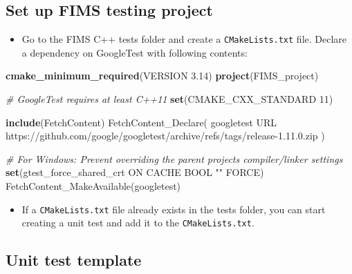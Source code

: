 \documentclass[
]{book}
\newenvironment{Shaded}{\begin{snugshade}}{\end{snugshade}}
\newcommand{\CommentTok}[1]{\textcolor[rgb]{0.56,0.35,0.01}{\textit{#1}}}
\newcommand{\DataTypeTok}[1]{\textcolor[rgb]{0.13,0.29,0.53}{#1}}
\newcommand{\DecValTok}[1]{\textcolor[rgb]{0.00,0.00,0.81}{#1}}
\newcommand{\FunctionTok}[1]{\textcolor[rgb]{0.00,0.00,0.00}{#1}}
\newcommand{\KeywordTok}[1]{\textcolor[rgb]{0.13,0.29,0.53}{\textbf{#1}}}
\newcommand{\NormalTok}[1]{#1}
\newcommand{\OtherTok}[1]{\textcolor[rgb]{0.56,0.35,0.01}{#1}}
\newcommand{\StringTok}[1]{\textcolor[rgb]{0.31,0.60,0.02}{#1}}
\providecommand{\tightlist}{%
  \setlength{\itemsep}{0pt}\setlength{\parskip}{0pt}}
\begin{document}
\hypertarget{set-up-fims-testing-project}{%
\subsection{Set up FIMS testing project}\label{set-up-fims-testing-project}}

\begin{itemize}
\tightlist
\item
  Go to the FIMS C++ tests folder and create a \texttt{CMakeLists.txt} file. Declare a dependency on GoogleTest with following contents:
\end{itemize}

\begin{Shaded}
\begin{Highlighting}[]
\KeywordTok{cmake\_minimum\_required}\NormalTok{(}\OtherTok{VERSION} \DataTypeTok{3.14}\NormalTok{)}
\KeywordTok{project}\NormalTok{(FIMS\_project)}

\CommentTok{\# GoogleTest requires at least C++11}
\KeywordTok{set}\NormalTok{(}\DecValTok{CMAKE\_CXX\_STANDARD}\NormalTok{ 11)}

\KeywordTok{include}\NormalTok{(FetchContent)}
\FunctionTok{FetchContent\_Declare}\NormalTok{(}
\NormalTok{  googletest}
\NormalTok{  URL https://github.com/google/googletest/archive/refs/tags/release{-}}\DataTypeTok{1.11.0}\NormalTok{.zip}
\NormalTok{)}

\CommentTok{\# For Windows: Prevent overriding the parent project\textquotesingle{}s compiler/linker settings}
\KeywordTok{set}\NormalTok{(gtest\_force\_shared\_crt }\OtherTok{ON} \OtherTok{CACHE} \OtherTok{BOOL} \StringTok{""} \OtherTok{FORCE}\NormalTok{)}
\FunctionTok{FetchContent\_MakeAvailable}\NormalTok{(googletest)}
\end{Highlighting}
\end{Shaded}

\begin{itemize}
\tightlist
\item
  If a \texttt{CMakeLists.txt} file already exists in the tests folder, you can start creating a unit test and add it to the \texttt{CMakeLists.txt}.
\end{itemize}

\hypertarget{unit-test-template}{%
\subsection{Unit test template}\label{unit-test-template}}
\end{document}
